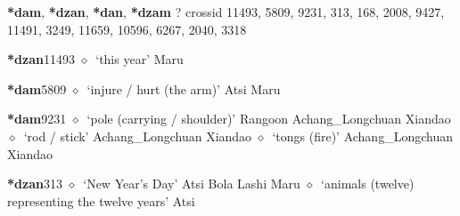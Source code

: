 \item
\textbf{*dam}, \textbf{*dzan}, \textbf{*dan}, \textbf{*dzam}
?
  {\tiny crossid 11493, 5809, 9231, 313, 168, 2008, 9427, 11491, 3249, 11659, 10596, 6267, 2040, 3318}
  \begin{list}{}{\leftmargin=1.5em \itemindent=-1.5em}
  \item {\footnotesize \textbf{*dzan}}{\tiny 11493}
         $\diamond$~`this year'
         Maru 
  \item {\footnotesize \textbf{*dam}}{\tiny 5809}
\hspace{1ex}
         $\diamond$~`injure / hurt (the arm)'
         Atsi 
\hspace{1ex}
         Maru 
  \item {\footnotesize \textbf{*dam}}{\tiny 9231}
\hspace{1ex}
         $\diamond$~`pole (carrying / shoulder)'
         Rangoon 
\hspace{1ex}
         Achang\_Longchuan 
\hspace{1ex}
         Xiandao 
\hspace{1ex}
         $\diamond$~`rod / stick'
         Achang\_Longchuan 
\hspace{1ex}
         Xiandao 
\hspace{1ex}
         $\diamond$~`tongs (fire)'
         Achang\_Longchuan 
\hspace{1ex}
         Xiandao 
  \item {\footnotesize \textbf{*dzan}}{\tiny 313}
\hspace{1ex}
         $\diamond$~`New Year's Day'
         Atsi 
\hspace{1ex}
         Bola 
\hspace{1ex}
         Lashi 
\hspace{1ex}
         Maru 
\hspace{1ex}
         $\diamond$~`animals (twelve) representing the twelve years'
         Atsi 
\hspace{1ex}

\end{list}

